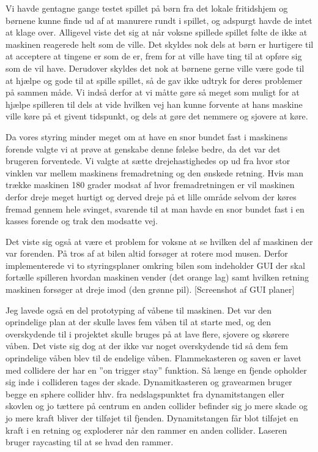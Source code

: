 Vi havde gentagne gange testet spillet på børn fra det lokale
fritidshjem og børnene kunne finde ud af at manurere rundt i spillet,
og adspurgt havde de intet at klage over. Alligevel viste det sig at
når voksne spillede spillet følte de ikke at maskinen reagerede helt
som de ville. Det skyldes nok dels at børn er hurtigere til at
acceptere at tingene er som de er, frem for at ville have ting til at
opføre sig som de vil have. Derudover skyldes det nok at børnene gerne
ville være gode til at hjælpe og gode til at spille spillet, så de gav
ikke udtryk for deres problemer på sammen måde. Vi indså derfor at vi
måtte gøre så meget som muligt for at hjælpe spilleren til dels at
vide hvilken vej han kunne forvente at hans maskine ville køre på et
givent tidspunkt, og dels at gøre det nemmere og sjovere at køre.

Da vores styring minder meget om at have en snor bundet fast i
maskinens forende valgte vi at prøve at genskabe denne følelse bedre,
da det var det brugeren forventede. Vi valgte at sætte
drejehastighedes op ud fra hvor stor vinklen var mellem maskinens
fremadretning og den ønskede retning. Hvis man trække maskinen 180
grader modsat af hvor fremadretningen er vil maskinen derfor dreje
meget hurtigt og derved dreje på et lille område selvom der køres
fremad gennem hele svinget, svarende til at man havde en snor bundet
fast i en kasses forende og trak den modsatte vej.

Det viste sig også at være et problem for voksne at se hvilken del af
maskinen der var forenden. På tros af at bilen altid forsøger at
rotere mod musen. Derfor implementerede vi to styringsplaner omkring
bilen som indeholder GUI der skal fortælle spilleren hvordan maskinen
vender (det orange lag) samt hvilken retning maskinen forsøger at
dreje imod (den grønne pil).  [Screenshot af GUI planer]

Jeg lavede også en del prototyping af våbene til maskinen. Det var den
oprindelige plan at der skulle laves fem våben til at starte med, og
den overskydende til i projektet skulle bruges på at lave flere,
sjovere og skørere våben. Det viste sig dog at der ikke var noget
overskydende tid så dem fem oprindelige våben blev til de endelige
våben. Flammekasteren og saven er lavet med collidere der har en ''on
trigger stay'' funktion. Så længe en fjende opholder sig inde i
collideren tages der skade. Dynamitkasteren og gravearmen bruger begge
en sphere collider hhv. fra nedslagspunktet fra dynamitstangen eller
skovlen og jo tættere på centrum en anden collider befinder sig jo
mere skade og jo mere kraft bliver der tilføjet til
fjenden. Dynamitstangen får blot tilføjet en kraft i en retning og
exploderer når den rammer en anden collider. Laseren bruger raycasting
til at se hvad den rammer.

